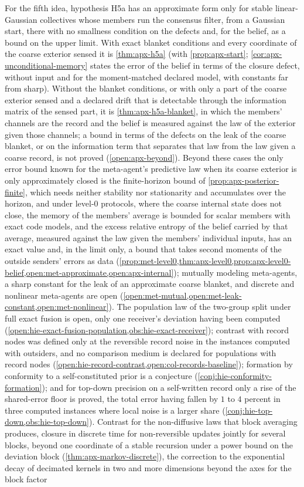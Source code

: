 For the fifth idea, hypothesis H5a has an approximate form only for stable linear-Gaussian collectives whose members run the consensus filter, from a Gaussian start, there with no smallness condition on the defects and, for the belief, as a bound on the upper limit. With exact blanket conditions and every coordinate of the coarse exterior sensed it is \cref{thm:apx-h5a} (with \cref{prop:apx-start}; \cref{cor:apx-unconditional-memory} states the error of the belief in terms of the closure defect, without input and for the moment-matched declared model, with constants far from sharp). Without the blanket conditions, or with only a part of the coarse exterior sensed and a declared drift that is detectable through the information matrix of the sensed part, it is \cref{thm:apx-h5a-blanket}, in which the members' channels are the record and the belief is measured against the law of the exterior given those channels; a bound in terms of the defects on the leak of the coarse blanket, or on the information term that separates that law from the law given a coarse record, is not proved (\cref{open:apx-beyond}). Beyond these cases the only error bound known for the meta-agent's predictive law when its coarse exterior is only approximately closed is the finite-horizon bound of \cref{prop:apx-posterior-finite}, which needs neither stability nor stationarity and accumulates over the horizon, and under level-0 protocols, where the coarse internal state does not close, the memory of the members' average is bounded for scalar members with exact code models, and the excess relative entropy of the belief carried by that average, measured against the law given the members' individual inputs, has an exact value and, in the limit only, a bound that takes second moments of the outside senders' errors as data (\cref{prop:met-level0,thm:apx-level0,prop:apx-level0-belief,open:met-approximate,open:apx-internal}); mutually modeling meta-agents, a sharp constant for the leak of an approximate coarse blanket, and discrete and nonlinear meta-agents are open (\cref{open:met-mutual,open:met-leak-constant,open:met-nonlinear}). The population law of the two-group split under full exact fusion is open, only one receiver's deviation having been computed (\cref{open:hie-exact-fusion-population,obs:hie-exact-receiver}); contrast with record nodes was defined only at the reversible record noise in the instances computed with outsiders, and no comparison medium is declared for populations with record nodes (\cref{open:hie-record-contrast,open:col-records-baseline}); formation by conformity to a self-constituted prior is a conjecture (\cref{conj:hie-conformity-formation}); and for top-down precision on a self-written record only a rise of the shared-error floor is proved, the total error having fallen by $1$ to $4$ percent in three computed instances where local noise is a larger share (\cref{conj:hie-top-down,obs:hie-top-down}). Contrast for the non-diffusive laws that block averaging produces, closure in discrete time for non-reversible updates jointly for several blocks, beyond one coordinate of a stable recursion under a power bound on the deviation block (\cref{thm:apx-markov-discrete}), the correction to the exponential decay of decimated kernels in two and more dimensions beyond the axes for the block factor 